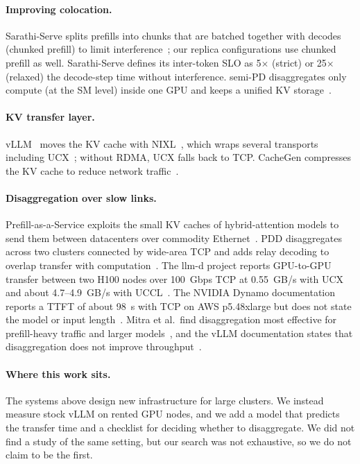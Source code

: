 \documentclass[11pt]{article}
\begin{document}
\paragraph{Improving colocation.} Sarathi-Serve splits prefills into chunks that are batched together with decodes (chunked prefill) to limit interference~\cite{sarathi}; our replica configurations use chunked prefill as well. Sarathi-Serve defines its inter-token SLO as 5$\times$ (strict) or 25$\times$ (relaxed) the decode-step time without interference. semi-PD disaggregates only compute (at the SM level) inside one GPU and keeps a unified KV storage~\cite{semipd}.

\paragraph{KV transfer layer.} vLLM~\cite{vllm} moves the KV cache with NIXL~\cite{nixl}, which wraps several transports including UCX~\cite{ucx}; without RDMA, UCX falls back to TCP. CacheGen compresses the KV cache to reduce network traffic~\cite{cachegen}.

\paragraph{Disaggregation over slow links.} Prefill-as-a-Service exploits the small KV caches of hybrid-attention models to send them between datacenters over commodity Ethernet~\cite{prfaas}. PDD disaggregates across two clusters connected by wide-area TCP and adds relay decoding to overlap transfer with computation~\cite{pdd}. The llm-d project reports GPU-to-GPU transfer between two H100 nodes over 100~Gbps TCP at 0.55~GB/s with UCX and about 4.7--4.9~GB/s with UCCL~\cite{llmdblog}. The NVIDIA Dynamo documentation reports a TTFT of about 98~s with TCP on AWS p5.48xlarge but does not state the model or input length~\cite{dynamodocs}. Mitra et al.\ find disaggregation most effective for prefill-heavy traffic and larger models~\cite{beyondbuzz}, and the vLLM documentation states that disaggregation does not improve throughput~\cite{vllmdocs}.

\paragraph{Where this work sits.} The systems above design new infrastructure for large clusters. We instead measure stock vLLM on rented GPU nodes, and we add a model that predicts the transfer time and a checklist for deciding whether to disaggregate. We did not find a study of the same setting, but our search was not exhaustive, so we do not claim to be the first.
\end{document}
